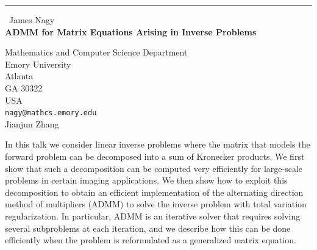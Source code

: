 \documentclass{report}
\begin{document}
\begin{center}
\rule{6in}{1pt} \
{\large James Nagy \\
{\bf ADMM for Matrix Equations Arising in Inverse Problems}}

Mathematics and Computer Science Department \\ Emory University \\ Atlanta \\ GA 30322 \\ USA
\\
{\tt nagy@mathcs.emory.edu}\\
Jianjun Zhang\end{center}

In this talk we consider linear inverse problems where the matrix that
models the forward problem can be decomposed into a sum of Kronecker
products. We first show that such a decomposition can be computed
very efficiently for large-scale problems in certain imaging
applications. We then show how to exploit this decomposition to
obtain an efficient implementation of the alternating direction method
of multipliers (ADMM) to solve the inverse problem with total
variation regularization. In particular, ADMM is an iterative solver
that requires solving several subproblems at each iteration, and we
describe how this can be done efficiently when the problem is
reformulated as a generalized matrix equation.
\end{document}
